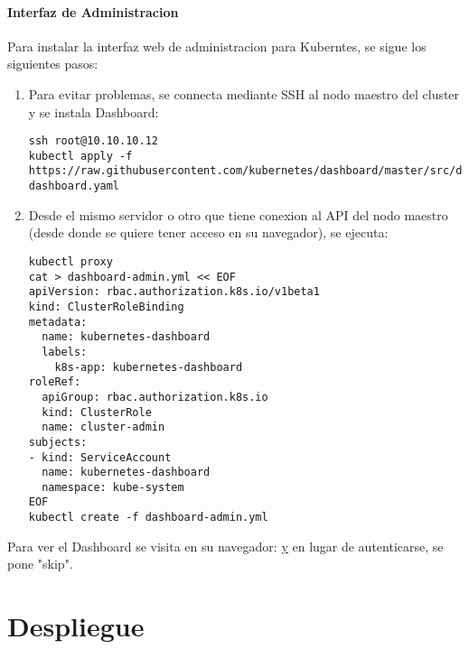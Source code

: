 \paragraph{Interfaz de Administracion}
Para instalar la interfaz web de administracion para Kuberntes, se sigue los siguientes pasos:
\begin{enumerate}
	\item Para evitar problemas, se connecta mediante SSH al nodo maestro del cluster y se instala Dashboard:
		\begin{lstlisting}
ssh root@10.10.10.12
kubectl apply -f https://raw.githubusercontent.com/kubernetes/dashboard/master/src/deploy/recommended/kubernetes-dashboard.yaml
		\end{lstlisting}
	\item Desde el mismo servidor o otro que tiene conexion al API del nodo maestro (desde donde se quiere tener acceso en su navegador), se ejecuta:
    	\begin{lstlisting}
kubectl proxy
cat > dashboard-admin.yml << EOF       
apiVersion: rbac.authorization.k8s.io/v1beta1
kind: ClusterRoleBinding
metadata:
  name: kubernetes-dashboard
  labels:
    k8s-app: kubernetes-dashboard
roleRef:
  apiGroup: rbac.authorization.k8s.io
  kind: ClusterRole
  name: cluster-admin
subjects:
- kind: ServiceAccount
  name: kubernetes-dashboard
  namespace: kube-system
EOF
kubectl create -f dashboard-admin.yml
    	\end{lstlisting}
\end{enumerate}
Para ver el Dashboard se visita en su navegador: \href{http://localhost:8001/api/v1/namespaces/kube-system/services/https:kubernetes-dashboard:/proxy/} y en lugar de autenticarse, se pone "skip".
  

\section{Despliegue}

